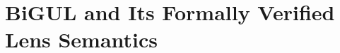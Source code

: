 \documentclass{sigplanconf}
\newtheorem*{theorem}{Theorem}
\renewcommand{\emph}{\textsl}
\begin{document}
\section{BiGUL and Its Formally Verified Lens Semantics}
\label{sec:BiGUL}

\end{document}
